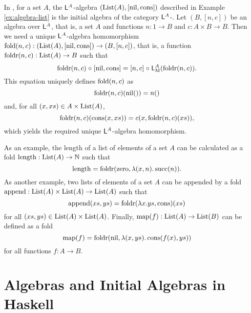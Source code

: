 \begin{example}
  \label{ex:initial-algebra-list}


  In \set, for a set $A$, the $\mathsf{L}^{A}$-algebra
  $(\text{List}(A),[\operatorname{nil},\operatorname{cons}])$ described in Example
  \ref{ex:algebra-list} is the initial algebra of the category
  $\mathsf{L}^{A}$-\alg. Let $(B,[n,c])$ be an algebra over
  $\mathsf{L}^{A}$, that is, a set $A$ and functions $n: 1 \to B$ and
  $c: A \times B \to B$. Then we need a unique $\mathsf{L}^{A}$-algebra
  homomorphism $\operatorname{fold}(n,c): (\text{List}(A),[\operatorname{nil},\operatorname{cons}]) \to (B,[n,c])$,
  that is, a function $\operatorname{foldr}(n,c): \text{List}(A) \to B$ such that
  \begin{equation*}
    \operatorname{foldr}(n,c) \mathrel{\circ} [\operatorname{nil},\operatorname{cons}] = [n,c] \mathrel{\circ} \mathsf{L}_{\operatorname{M}}^{A}(\operatorname{foldr}(n,c))
    \text{.}
  \end{equation*}
  This equation uniquely defines $\operatorname{fold}(n,c)$ as
  \begin{equation*}
    \operatorname{foldr}(n,c)(\operatorname{nil}()) = n()
  \end{equation*}
  and, for all $(x,xs) \in A \times \text{List}(A)$,
  \begin{equation*}
    \operatorname{foldr}(n,c)(\operatorname{cons}(x,xs)) = c(x,\operatorname{foldr}(n,c)(xs))
    \text{,}
  \end{equation*}
  which yields the required unique $\mathsf{L}^{A}$-algebra
  homomorphism.

  As an example, the length of a list of elements of a set $A$ can be
  calculated as a fold $\operatorname{length}: \text{List}(A) \to \mathbb{N}$ such that
  \begin{equation*}
    \operatorname{length} = \operatorname{foldr}(\operatorname{zero},\lambda(x,n).\operatorname{succ}(n))
    \text{.}
  \end{equation*}
  As another example, two lists of elements of a set $A$ can be
  appended by a fold $\operatorname{append}: \text{List}(A) \times \text{List}(A) \to
  \text{List}(A)$ such that
  \begin{equation*}
    \operatorname{append}(xs,ys) = \operatorname{foldr}(\lambda x.ys,\operatorname{cons})(xs)
  \end{equation*}
  for all $(xs,ys) \in \text{List}(A) \times \text{List}(A)$. Finally,
  $\operatorname{map}(f): \text{List}(A) \to \text{List}(B)$ can be defined as a fold
  \begin{equation*}
    \operatorname{map}(f) = \operatorname{foldr}(\operatorname{nil},\lambda(x,ys).\operatorname{cons}(f(x),ys))
  \end{equation*}
  for all functions $f: A \to B$.

\end{example}

\section{Algebras and Initial Algebras in Haskell}
\label{sec:algebras-haskell}

